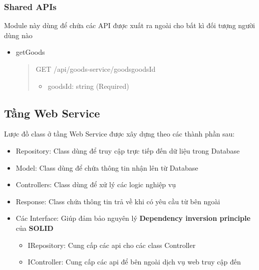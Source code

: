 \subsubsection{Shared APIs}
Module này dùng để chứa các API được xuất ra ngoài cho bất kì đối tượng người dùng nào

\begin{itemize}
	\item getGoods
	      \begin{quote}
		      GET /api/goods-service/goods{goodsId}
		      \begin{itemize}
			      \item goodsId: string (Required)
		      \end{itemize}
	      \end{quote}
\end{itemize}



\subsection{Tầng Web Service}
 
Lược đồ class ở tầng Web Service được xây dựng theo các thành phần sau:
\begin{itemize}
    \item Repository: Class dùng để truy cập trực tiếp đến dữ liệu trong Database
    \item Model: Class dùng để chứa thông tin nhận lên từ Database
    \item Controllers: Class dùng để xử lý các logic nghiệp vụ
    \item Response: Class chứa thông tin trả về khi có yêu cầu từ bên ngoài
    \item Các Interface: Giúp đảm bảo nguyên lý \textbf{Dependency inversion principle} của \textbf{SOLID}
    \begin {itemize}
        \item IRepository: Cung cấp các api cho các class Controller
        \item IController: Cung cấp các api để bên ngoài dịch vụ web truy cập đến
    \end{itemize}
\end{itemize}

\newpage

